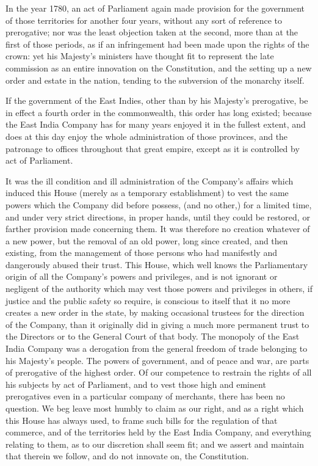 In the year 1780, an act of Parliament again made provision for the government of those territories for another four years, without any sort of reference to prerogative; nor was the least objection taken at the second, more than at the first of those periods, as if an infringement had been made upon the rights of the crown: yet his Majesty's ministers have thought fit to represent the late commission as an entire innovation on the Constitution, and the setting up a new order and estate in the nation, tending to the subversion of the monarchy itself.

If the government of the East Indies, other than by his Majesty's prerogative, be in effect a fourth order in the commonwealth, this order has long existed; because the East India Company has for many years enjoyed it in the fullest extent, and does at this day enjoy the whole administration of those provinces, and the patronage to offices throughout that great empire, except as it is controlled by act of Parliament.

It was the ill condition and ill administration of the Company's affairs which induced this House (merely as a temporary establishment) to vest the same powers which the Company did before possess, (and no other,) for a limited time, and under very strict directions, in proper hands, until they could be restored, or farther provision made concerning them. It was therefore no creation whatever of a new power, but the removal of an old power, long since created, and then existing, from the management of those persons who had manifestly and dangerously abused their trust. This House, which well knows the Parliamentary origin of all the Company's powers and privileges, and is not ignorant or negligent of the authority which may vest those powers and privileges in others, if justice and the public safety so require, is conscious to itself that it no more creates a new order in the state, by making occasional trustees for the direction of the Company, than it originally did in giving a much more permanent trust to the Directors or to the General Court of that body. The monopoly of the East India Company was a derogation from the general freedom of trade belonging to his Majesty's people. The powers of government, and of peace and war, are parts of prerogative of the highest order. Of our competence to restrain the rights of all his subjects by act of Parliament, and to vest those high and eminent prerogatives even in a particular company of merchants, there has been no question. We beg leave most humbly to claim as our right, and as a right which this House has always used, to frame such bills for the regulation of that commerce, and of the territories held by the East India Company, and everything relating to them, as to our discretion shall seem fit; and we assert and maintain that therein we follow, and do not innovate on, the Constitution.

